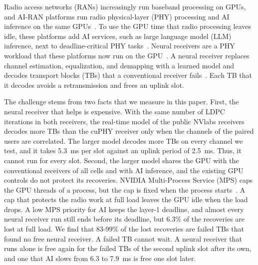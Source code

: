 \documentclass[acmsmall,screen,review,anonymous]{acmart}
\begin{document}
Radio access networks (RANs) increasingly run baseband processing on GPUs, and AI-RAN platforms run radio
physical-layer (PHY) processing and AI inference on the same GPUs~\cite{aerial,yinyangran,interplay,distributedairan}.
To use the GPU time that radio processing leaves idle, these platforms add AI services, such as large
language model (LLM) inference, next to deadline-critical PHY tasks~\cite{caora,haf}. Neural receivers are a
PHY workload that these platforms now run on the GPU~\cite{aerial,nrxrt}. A neural receiver replaces channel
estimation, equalization, and demapping with a learned model and decodes transport blocks (TBs) that a
conventional receiver fails~\cite{deeprx,nrx5g,nrxrt}. Each TB that it decodes avoids a retransmission and
frees an uplink slot.

The challenge stems from two facts that we measure in this paper. First, the neural receiver that helps
is expensive. With the same number of LDPC iterations in both receivers, the real-time model of the public
NVlabs receivers~\cite{nrxrt,neuralrxsw} decodes more TBs than the cuPHY receiver only when the channels of
the paired users are correlated. The larger model decodes more TBs on every channel we test, and it takes
5.3~ms per slot against an uplink period of 2.5~ms. Thus, it cannot run for every slot. Second, the larger
model shares the GPU with the conventional receivers of all cells and with AI inference, and the existing
GPU controls do not protect its recoveries. NVIDIA Multi-Process Service (MPS) caps the GPU threads of a
process, but the cap is fixed when the process starts~\cite{nvidiampS}. A cap that protects the radio work
at full load leaves the GPU idle when the load drops. A low MPS priority for AI keeps the layer-1 deadline,
and almost every neural receiver run still ends before its deadline, but 6.3\% of the recoveries are lost at
full load. We find that 83-99\% of the lost recoveries are failed TBs that found no free neural receiver. A
failed TB cannot wait. A neural receiver that runs alone is free again for the failed TBs of the second
uplink slot after its own, and one that AI slows from 6.3 to 7.9~ms is free one slot later.
\end{document}
